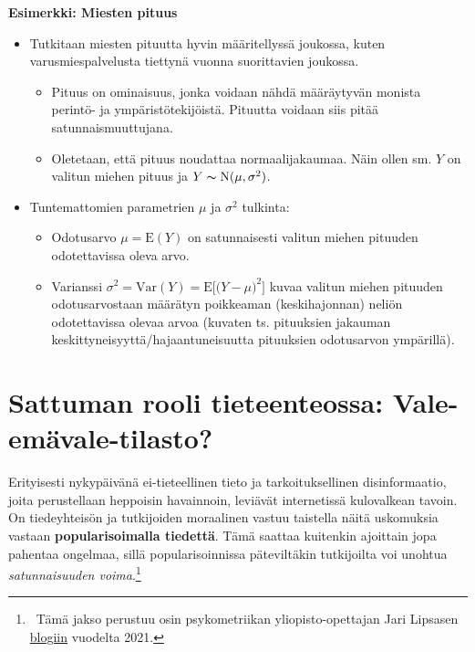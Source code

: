 \documentclass[
]{book}
\providecommand{\tightlist}{%
  \setlength{\itemsep}{0pt}\setlength{\parskip}{0pt}}
\begin{document}
\begin{eblock}{}

\textbf{Esimerkki: Miesten pituus}

\begin{itemize}
\tightlist
\item
  Tutkitaan miesten pituutta hyvin määritellyssä joukossa, kuten varusmiespalvelusta tiettynä vuonna suorittavien joukossa.

  \begin{itemize}
  \tightlist
  \item
    Pituus on ominaisuus, jonka voidaan nähdä määräytyvän monista perintö- ja ympäristötekijöistä. Pituutta voidaan siis pitää satunnaismuuttujana.
  \item
    Oletetaan, että pituus noudattaa normaalijakaumaa. Näin ollen sm. \(Y\) on valitun miehen pituus ja \(Y \thicksim \text{N}(\mu, \sigma^2)\).
  \end{itemize}
\item
  Tuntemattomien parametrien \(\mu\) ja \(\sigma^2\) tulkinta:

  \begin{itemize}
  \tightlist
  \item
    Odotusarvo \(\mu = \text{E}(Y)\) on satunnaisesti valitun miehen pituuden odotettavissa oleva arvo.
  \item
    Varianssi \(\sigma^2 = \mathrm{Var}(Y) = \text{E} \Big[\Big(Y- \mu \Big)^2 \Big]\) kuvaa valitun miehen pituuden odotusarvostaan määrätyn poikkeaman (keskihajonnan) neliön odotettavissa olevaa arvoa (kuvaten ts. pituuksien jakauman keskittyneisyyttä/hajaantuneisuutta pituuksien odotusarvon ympärillä).
  \end{itemize}
\end{itemize}

\end{eblock}

\hfill\break

\hypertarget{alaluku46}{%
\section{Sattuman rooli tieteenteossa: Vale-emävale-tilasto?}\label{alaluku46}}

Erityisesti nykypäivänä ei-tieteellinen tieto ja tarkoituksellinen disinformaatio, joita perustellaan heppoisin havainnoin, leviävät internetissä kulovalkean tavoin. On tiedeyhteisön ja tutkijoiden moraalinen vastuu taistella näitä uskomuksia vastaan \textbf{popularisoimalla tiedettä}. Tämä saattaa kuitenkin ajoittain jopa pahentaa ongelmaa, sillä popularisoinnissa päteviltäkin tutkijoilta voi unohtua \emph{satunnaisuuden voima}.\footnote{~Tämä jakso perustuu osin psykometriikan yliopisto-opettajan Jari Lipsasen \href{https://blogs.helsinki.fi/med-viikonjuttu/2021/02/22/vale-emavale-tilasto}{blogiin} vuodelta 2021.}
\end{document}

